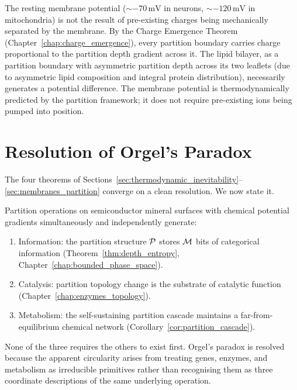 \begin{corollary}
\label{cor:membrane_potential}
The resting membrane potential ($\sim -70\,\mathrm{mV}$ in neurons,
$\sim -120\,\mathrm{mV}$ in mitochondria) is not the result of pre-existing
charges being mechanically separated by the membrane. By the Charge Emergence
Theorem (Chapter~\ref{chap:charge_emergence}), every partition boundary
carries charge proportional to the partition depth gradient across it. The lipid
bilayer, as a partition boundary with asymmetric partition depth across its two
leaflets (due to asymmetric lipid composition and integral protein distribution),
necessarily generates a potential difference. The membrane potential is
thermodynamically predicted by the partition framework; it does not require
pre-existing ions being pumped into position.
\end{corollary}

\section{Resolution of Orgel's Paradox}
\label{sec:orgel_resolution}

The four theorems of Sections~\ref{sec:thermodynamic_inevitability}--\ref{sec:membranes_partition}
converge on a clean resolution. We now state it.

\begin{theorem}
\label{thm:orgel_resolution}
Partition operations on semiconductor mineral surfaces with chemical potential
gradients simultaneously and independently generate:
\begin{enumerate}[label=(\roman*)]
  \item Information: the partition structure $\mathcal{P}$ stores $\mathcal{M}$ bits of
        categorical information (Theorem~\ref{thm:depth_entropy},
        Chapter~\ref{chap:bounded_phase_space}).
  \item Catalysis: partition topology change is the substrate of catalytic
        function (Chapter~\ref{chap:enzymes_topology}).
  \item Metabolism: the self-sustaining partition cascade maintains a
        far-from-equilibrium chemical network (Corollary~\ref{cor:partition_cascade}).
\end{enumerate}
None of the three requires the others to exist first. Orgel's paradox is
resolved because the apparent circularity arises from treating genes, enzymes,
and metabolism as irreducible primitives rather than recognising them as three
coordinate descriptions of the same underlying operation.
\end{theorem}

